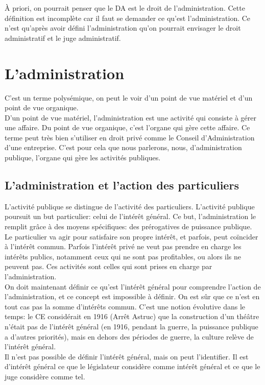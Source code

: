 \documentclass[10pt, a4paper, openany]{book}
\begin{document}
À priori, on pourrait penser que le DA est le droit de l'administration. Cette définition est incomplète car il faut se demander ce qu'est l'administration. Ce n'est qu'après avoir défini l'administration qu'on pourrait envisager le droit administratif et le juge administratif.

\section{L'administration}

C'est un terme polysémique, on peut le voir d'un point de vue matériel et d'un point de vue organique. \\
D'un point de vue matériel, l'administration est une activité qui consiste à gérer une affaire. Du point de vue organique, c'est l'organe qui gère cette affaire. Ce terme peut très bien s'utiliser en droit privé comme le Conseil d'Administration d'une entreprise. C'est pour cela que nous parlerons, nous, d'administration publique, l'organe qui gère les activités publiques.

\subsection{L'administration et l'action des particuliers}

L'activité publique se distingue de l'activité des particuliers. L'activité publique poursuit un but particulier: celui de l'intérêt général. Ce but, l'administration le remplit grâce à des moyens spécifiques: des prérogatives de puissance publique. Le particulier va agir pour satisfaire son propre intérêt, et parfois, peut coïncider à l'intérêt commun. Parfois l'intérêt privé ne veut pas prendre en charge les intérêts publics, notamment ceux qui ne sont pas profitables, ou alors ils ne peuvent pas. Ces activités sont celles qui sont prises en charge par l'administration. \\
On doit maintenant définir ce qu'est l'intérêt général pour comprendre l'action de l'administration, et ce concept est impossible à définir. On est sûr que ce n'est en tout cas pas la somme d'intérêts commun. C'est une notion évolutive dans le temps: le CE considérait en 1916 (Arrêt Astruc) que la construction d'un théâtre n'était pas de l'intérêt général (en 1916, pendant la guerre, la puissance publique a d'autres priorités), mais en dehors des périodes de guerre, la culture relève de l'intérêt général. \\
Il n'est pas possible de définir l'intérêt général, mais on peut  l'identifier. Il est d'intérêt général ce que le législateur considère comme intérêt général et ce que le juge considère comme tel.
\end{document}
